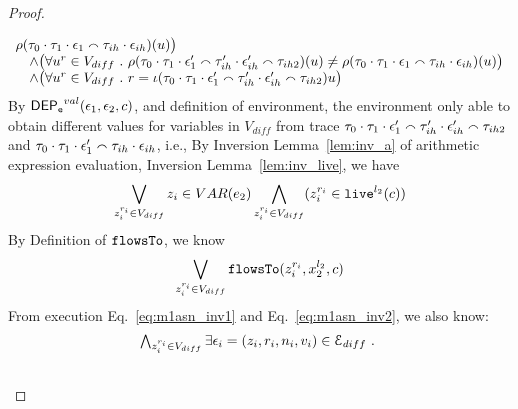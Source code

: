 \begin{proof}
\begin{case}
\begin{subcase}
\begin{subsubcase}
\begin{subsubsubcase}
\[\begin{array}{l}
    \rho(\mathtt{\tau}_0 \cdot \mathtt{\tau}_1 \cdot \mathtt{\epsilon}_1 \smallfrown \mathtt{\tau}_{ih} \cdot \mathtt{\epsilon}_{ih}) (u)
    \big)
  \\ \quad \land
  \big(\forall u^r \in V_{diff} ~.~ \rho(\mathtt{\tau}_0 \cdot \mathtt{\tau}_1 \cdot \mathtt{\epsilon}_1' \smallfrown \mathtt{\tau}_{ih}' \cdot \mathtt{\epsilon}_{ih}' \smallfrown \mathtt{\tau}_{ih2}) (u) \neq 
    \rho(\mathtt{\tau}_0 \cdot \mathtt{\tau}_1 \cdot \mathtt{\epsilon}_1 \smallfrown \mathtt{\tau}_{ih} \cdot \mathtt{\epsilon}_{ih}) (u) \big)
    \\ \quad \land
    \big(\forall u^r \in V_{diff} ~.~ r = \iota(\mathtt{\tau}_0 \cdot \mathtt{\tau}_1 \cdot \mathtt{\epsilon}_1' \smallfrown \mathtt{\tau}_{ih}' \cdot \mathtt{\epsilon}_{ih}' \smallfrown \mathtt{\tau}_{ih2}) u \big)
  \end{array}
\]
%
By $\mathsf{DEP_{\mathtt{e}}}^{val}(\mathtt{\epsilon}_1, \mathtt{\epsilon}_2, c)$, and definition of environment, 
the environment only able to obtain different values for variables in $V_{diff}$
from trace $\mathtt{\tau}_0 \cdot \mathtt{\tau}_1 \cdot \mathtt{\epsilon}_1' \smallfrown \mathtt{\tau}_{ih}' \cdot \mathtt{\epsilon}_{ih}' \smallfrown \mathtt{\tau}_{ih2}$ 
and 
$\mathtt{\tau}_0 \cdot \mathtt{\tau}_1 \cdot \mathtt{\epsilon}_1' \smallfrown \mathtt{\tau}_{ih} \cdot \mathtt{\epsilon}_{ih}$, i.e.,
%
%
%
%
By {Inversion Lemma~\ref{lem:inv_a}} of arithmetic expression evaluation, Inversion Lemma~\ref{lem:inv_live}, we have 
%
\[
  \bigvee_{z_i^{r_i} \in V_{diff}} z_i \in VAR(e_2)
  \bigwedge_{z_i^{r_i} \in V_{diff}} (z_i^{r_i} \in \mathtt{live}^{l_2}(c))
\]
%
%
By Definition of $\mathtt{flowsTo}$, we know
\[
   \bigvee_{z_i^{r_i} \in V_{diff}}  \mathtt{flowsTo}(z_i^{r_i}, x_2^{l_2}, c)
\]
%
From execution Eq.~\ref{eq:m1asn_inv1} and Eq.~\ref{eq:m1asn_inv2}, we also know:
\[
\begin{array}{l}
  \bigwedge_{z_i^{r_i} \in V_{diff}}
  \exists \mathtt{\epsilon}_i = (z_i, r_i, n_i, v_i) 
  \in \mathcal{E}_{diff} 
  ~.~ 
  \\ \qquad 

\end{array}\]
\end{subsubsubcase}
\end{subsubcase}
\end{subcase}
\end{case}
\end{proof}
